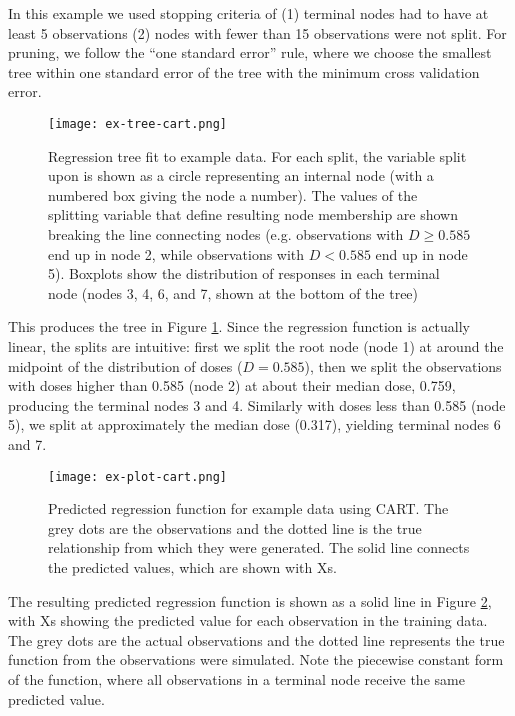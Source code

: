 \documentclass[12pt]{article}
\begin{document}
In this example we used stopping criteria of (1) terminal nodes had to have at least 5 observations (2) nodes with fewer than 15 observations were not split. For pruning, we follow the ``one standard error'' rule, where we choose the smallest tree within one standard error of the tree with the minimum cross validation error.

\begin{figure}[h]
\begin{center}
\texttt{[image: ex-tree-cart.png]}
\end{center}
\caption[Regression tree fit to example data]{Regression tree fit to example data. For each split, the variable split upon is shown as a circle representing an internal node (with a numbered box giving the node a number). The values of the splitting variable that define resulting node membership are shown breaking the line connecting nodes (e.g. observations with $D \geq 0.585$ end up in node 2, while observations with $D < 0.585$ end up in node 5). Boxplots show the distribution of responses in each terminal node (nodes 3, 4, 6, and 7, shown at the bottom of the tree)}
\label{fig:ex-cart-tree}
\end{figure}

This produces the tree in Figure \ref{fig:ex-cart-tree}. Since the regression function is actually linear, the splits are intuitive: first we split the root node (node 1) at around the midpoint of the distribution of doses ($D = 0.585$), then we split the observations with doses higher than 0.585 (node 2) at about their median dose, 0.759, producing the terminal nodes 3 and 4. Similarly with doses less than 0.585 (node 5), we split at approximately the median dose (0.317), yielding terminal nodes 6 and 7. 

\begin{figure}[h]
\begin{center}
\texttt{[image: ex-plot-cart.png]}
\end{center}
\caption[Predicted regression function for example data using CART]{Predicted regression function for example data using CART. The grey dots are the observations and the dotted line is the true relationship from which they were generated. The solid line connects the predicted values, which are shown with Xs.}
\label{fig:ex-plot-cart}
\end{figure}

The resulting predicted regression function is shown as a solid line in Figure \ref{fig:ex-plot-cart}, with Xs showing the predicted value for each observation in the training data. The grey dots are the actual observations and the dotted line represents the true function from the observations were simulated. Note the piecewise constant form of the function, where all observations in a terminal node receive the same predicted value.
\end{document}

